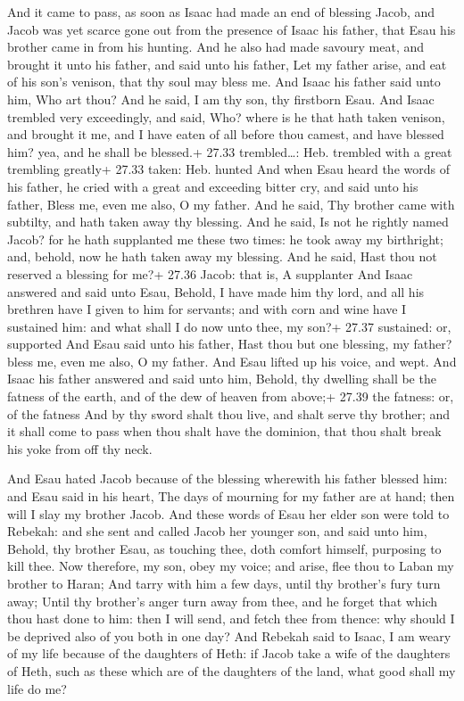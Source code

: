  And it came to pass, as soon as Isaac had made an end of
blessing Jacob, and Jacob was yet scarce gone out from the presence of
Isaac his father, that Esau his brother came in from his hunting.
 And he also had made savoury meat, and brought it unto his
father, and said unto his father, Let my father arise, and eat of his
son's venison, that thy soul may bless me.  And Isaac his
father said unto him, Who art thou? And he said, I am thy son, thy
firstborn Esau.  And Isaac trembled very exceedingly, and
said, Who? where is he that hath taken venison, and brought it me, and I
have eaten of all before thou camest, and have blessed him? yea, and he
shall be blessed.+ 27.33 trembled\ldots: Heb. trembled with a great
trembling greatly+ 27.33 taken: Heb. hunted  And when Esau
heard the words of his father, he cried with a great and exceeding
bitter cry, and said unto his father, Bless me, even me also, O my
father.  And he said, Thy brother came with subtilty, and
hath taken away thy blessing.  And he said, Is not he
rightly named Jacob? for he hath supplanted me these two times: he took
away my birthright; and, behold, now he hath taken away my blessing. And
he said, Hast thou not reserved a blessing for me?+ 27.36 Jacob: that
is, A supplanter  And Isaac answered and said unto Esau,
Behold, I have made him thy lord, and all his brethren have I given to
him for servants; and with corn and wine have I sustained him: and what
shall I do now unto thee, my son?+ 27.37 sustained: or, supported
 And Esau said unto his father, Hast thou but one blessing,
my father? bless me, even me also, O my father. And Esau lifted up his
voice, and wept.  And Isaac his father answered and said
unto him, Behold, thy dwelling shall be the fatness of the earth, and of
the dew of heaven from above;+ 27.39 the fatness: or, of the fatness
 And by thy sword shalt thou live, and shalt serve thy
brother; and it shall come to pass when thou shalt have the dominion,
that thou shalt break his yoke from off thy neck.

 And Esau hated Jacob because of the blessing wherewith
his father blessed him: and Esau said in his heart, The days of mourning
for my father are at hand; then will I slay my brother Jacob.
 And these words of Esau her elder son were told to
Rebekah: and she sent and called Jacob her younger son, and said unto
him, Behold, thy brother Esau, as touching thee, doth comfort himself,
purposing to kill thee.  Now therefore, my son, obey my
voice; and arise, flee thou to Laban my brother to Haran; 
And tarry with him a few days, until thy brother's fury turn away;
 Until thy brother's anger turn away from thee, and he
forget that which thou hast done to him: then I will send, and fetch
thee from thence: why should I be deprived also of you both in one day?
 And Rebekah said to Isaac, I am weary of my life because
of the daughters of Heth: if Jacob take a wife of the daughters of Heth,
such as these which are of the daughters of the land, what good shall my
life do me?

